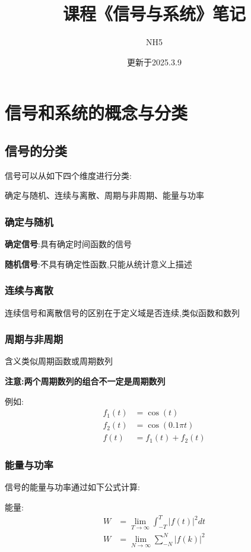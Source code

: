 \documentclass[12pt, a4paper, oneside]{ctexart}
\title{课程《信号与系统》笔记}
\author{NH5}
\date{更新于2025.3.9}
\begin{document}
\maketitle

\section{信号和系统的概念与分类}
\subsection{信号的分类}
信号可以从如下四个维度进行分类:

确定与随机、连续与离散、周期与非周期、能量与功率

\subsubsection{确定与随机}
\textbf{确定信号}:具有确定时间函数的信号

\textbf{随机信号}:不具有确定性函数,只能从统计意义上描述

\subsubsection{连续与离散}
连续信号和离散信号的区别在于定义域是否连续,类似函数和数列

\subsubsection{周期与非周期}
含义类似周期函数或周期数列

\textbf{注意:两个周期数列的组合不一定是周期数列}

例如:
\begin{align*}
    f_1(t) &= \cos (t)\\
    f_2(t) &= \cos (0.1 \pi t)\\
    f(t) &= f_1(t) + f_2(t)
\end{align*}

\subsubsection{能量与功率}
信号的能量与功率通过如下公式计算:

能量:
\begin{align*}
    W &= \lim_{T \to \infty}\int_{-T}^{T} |f(t)|^2 dt\\
    W &= \lim_{N \to \infty}\sum_{-N}^{N}|f(k)|^2
\end{align*}
\end{document}
